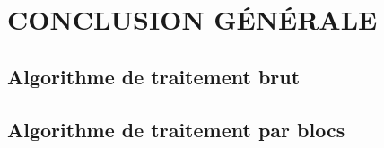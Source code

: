 \documentclass[12pt,twoside]{book}
\begin{document}
\chapter*{CONCLUSION GÉNÉRALE}

\backmatter
\begin{appendices}
\section{Algorithme de traitement brut}\label{Anne1}

\section{Algorithme de traitement par blocs}\label{Anne2}

\end{appendices}


\end{document}
